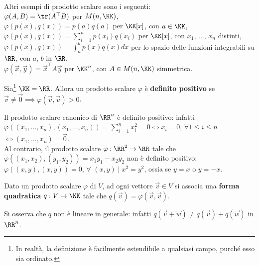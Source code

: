 \documentclass[11pt]{article}
\begin{document}
	\begin{example}
		Altri esempi di prodotto scalare sono i seguenti: \\
		
		\li $\varphi(A, B) = \tr(A^\top B)$ per $M(n, \KK)$, \\
		\li $\varphi(p(x), q(x)) = p(a) q(a)$ per $\KK[x]$, con $a \in \KK$, \\
		\li $\varphi(p(x), q(x)) = \sum_{i=1}^n p(x_i) q(x_i)$ per $\KK[x]$, con $x_1$, ..., $x_n$ distinti, \\
		\li $\varphi(p(x), q(x)) = \int_a^b p(x)q(x) dx$ per lo spazio delle funzioni integrabili su $\RR$, con $a$, $b$ in $\RR$, \\
		\li $\varphi(\vec{x}, \vec{y}) = \vec{x}^\top A \vec{y}$ per $\KK^n$, con $A \in M(n, \KK)$ simmetrica.
	\end{example}
	
	\begin{definition}
		Sia\footnote{In realtà, la definizione è facilmente estendibile a qualsiasi campo, purché esso
		sia ordinato.} $\KK = \RR$. Allora un prodotto scalare $\varphi$ è \textbf{definito positivo} se $\vec{v} \neq \vec{0} \implies
		\varphi(\vec{v}, \vec{v}) > 0$.
	\end{definition}

	\begin{example}
		Il prodotto scalare canonico di $\RR^n$ è definito positivo: infatti $\varphi((x_1, ..., x_n), (x_1, ..., x_n)) =
		\sum_{i=1}^n x_i^2  = 0 \iff x_i = 0$, $\forall 1 \leq i \leq n$ $\iff (x_1, ..., x_n) = \vec{0}$. \\
		
		Al contrario, il prodotto scalare $\varphi : \RR^2 \to \RR$ tale che $\varphi((x_1, x_2), (y_1, y_2)) = x_1 y_1 - x_2 y_2$ non è definito positivo: $\varphi((x, y), (x, y)) = 0$, $\forall$ $(x, y) \mid x^2 = y^2$, ossia se
		$y = x$ o $y = -x$.
	\end{example}

	\begin{definition}
		Dato un prodotto scalare $\varphi$ di $V$, ad ogni vettore $\vec{v} \in V$ si associa una \textbf{forma quadratica}
		$q : V \to \KK$ tale che $q(\vec{v}) = \varphi(\vec{v}, \vec{v})$.
	\end{definition}

	\begin{remark}
		Si osserva che $q$ non è lineare in generale: infatti $q(\vec{v} + \vec{w}) \neq q(\vec{v}) + q(\vec{w})$ in
		$\RR^n$.
	\end{remark}
\end{document}

